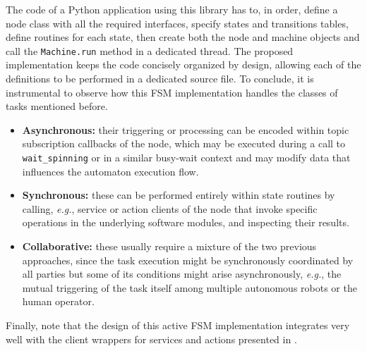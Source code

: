 The code of a \ROS Python application using this library has to, in order, define a \ROS node class with all the required interfaces, specify states and transitions tables, define routines for each state, then create both the node and machine objects and call the \texttt{Machine.run} method in a dedicated thread. The proposed implementation keeps the code concisely organized by design, allowing each of the definitions to be performed in a dedicated source file. To conclude, it is instrumental to observe how this FSM implementation handles the classes of tasks mentioned before.
\begin{itemize}
  \item \textbf{Asynchronous:} their triggering or processing can be encoded within topic subscription callbacks of the node, which may be executed during a call to \texttt{wait\_spinning} or in a similar busy-wait context and may modify data that influences the automaton execution flow.
  \item \textbf{Synchronous:} these can be performed entirely within state routines by calling, \emph{e.g.}, service or action clients of the node that invoke specific operations in the underlying software modules, and inspecting their results.
  \item \textbf{Collaborative:} these usually require a mixture of the two previous approaches, since the task execution might be synchronously coordinated by all parties but some of its conditions might arise asynchronously, \emph{e.g.}, the mutual triggering of the task itself among multiple autonomous robots or the human operator.
\end{itemize}
Finally, note that the design of this active FSM implementation integrates very well with the client wrappers for services and actions presented in .
